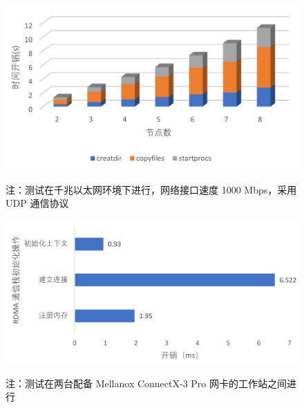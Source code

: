 {    \begin{figure}
        \centering
        \includegraphics[width=0.85\linewidth]{Img/程序不同集群规模开销.pdf}
        \label{fig:time-create-procs}
        {\footnotesize \par 注：测试在千兆以太网环境下进行，网络接口速度 1000 Mbps，采用 UDP 通信协议}
    \end{figure}

    \begin{figure}[!htbp]
        \centering
        \includegraphics[width=0.85\linewidth]{Img/RDMA通信栈初始化开销分析.pdf}
        \label{fig:time-init-rdma-comm}
        {\footnotesize \par 注：测试在两台配备 Mellanox ConnectX-3 Pro 网卡的工作站之间进行}
    \end{figure}

}
